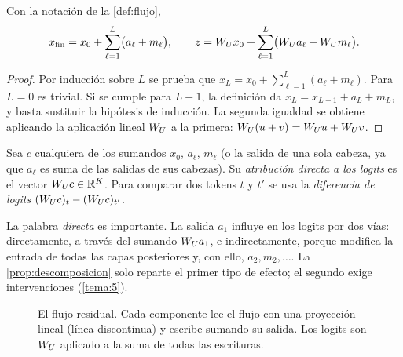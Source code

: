 \begin{proposicion}\label{prop:descomposicion}
Con la notación de la \cref{def:flujo},
\[
x_{\mathrm{fin}}=x_0+\sum_{\ell=1}^{L}\bigl(a_\ell+m_\ell\bigr),\qquad
z=W_{U} x_0+\sum_{\ell=1}^{L}\bigl(W_{U} a_\ell+W_{U} m_\ell\bigr).
\]
\end{proposicion}

\begin{proof}
Por inducción sobre $L$ se prueba que $x_L=x_0+\sum_{\ell=1}^{L}(a_\ell+m_\ell)$. Para $L=0$ es trivial. Si se cumple para $L-1$, la definición da $x_L=x_{L-1}+a_L+m_L$, y basta sustituir la hipótesis de inducción. La segunda igualdad se obtiene aplicando la aplicación lineal $W_{U}$ a la primera: $W_{U}(u+v)=W_{U} u+W_{U} v$.
\end{proof}

\begin{definicion}\label{def:dla}
Sea $c$ cualquiera de los sumandos $x_0$, $a_\ell$, $m_\ell$ (o la salida de una sola cabeza, ya que $a_\ell$ es suma de las salidas de sus cabezas). Su \emph{atribución directa a los logits} es el vector $W_{U} c\in\mathbb{R}^{K}$. Para comparar dos tokens $t$ y $t'$ se usa la \emph{diferencia de logits} $(W_{U} c)_t-(W_{U} c)_{t'}$.
\end{definicion}

La palabra \emph{directa} es importante. La salida $a_1$ influye en los logits por dos vías: directamente, a través del sumando $W_{U} a_1$, e indirectamente, porque modifica la entrada de todas las capas posteriores y, con ello, $a_2,m_2,\dots$. La \cref{prop:descomposicion} solo reparte el primer tipo de efecto; el segundo exige intervenciones (\cref{tema:5}).

\begin{figure}[h]
\centering
{}
\caption{El flujo residual. Cada componente lee el flujo con una proyección lineal (línea discontinua) y escribe sumando su salida. Los logits son $W_{U}$ aplicado a la suma de todas las escrituras.}
\label{fig:flujo}
\end{figure}

